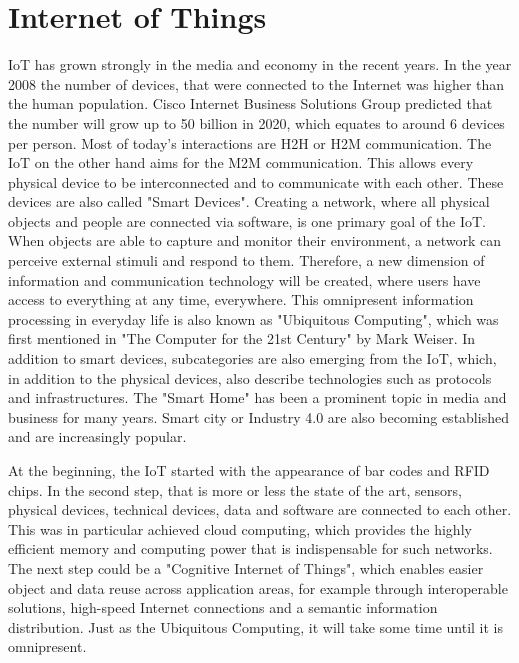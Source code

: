 \section{Internet of Things}
\ac{IoT} has grown strongly in the media and economy in the recent years.
In the year 2008 the number of devices, that were connected to the Internet was higher than the human population.\autocite[cf.][p. 3]{Eva:2011}
Cisco Internet Business Solutions Group predicted that the number will grow up to 50 billion in 2020, which equates to around 6 devices per person.\autocite[cf.][p. 4]{Eva:2011}
Most of today's interactions are \ac{H2H} or \ac{H2M} communication.
The \ac{IoT} on the other hand aims for the \ac{M2M} communication.
This allows every physical device to be interconnected and to communicate with each other.
These devices are also called "Smart Devices".
Creating a network, where all physical objects and people are connected via software, is one primary goal of the \ac{IoT}.\autocite[cf.][p.206]{Rui:2015}\autocite[cf.][p.2]{Kra:2013}
When objects are able to capture and monitor their environment, a network can perceive external stimuli and respond to them.\autocite[cf.][p. 40]{Itu11}
Therefore, a new dimension of information and communication technology will be created, where users have access to everything at any time, everywhere.
This omnipresent information processing in everyday life is also known as "Ubiquitous Computing", which was first mentioned in "The Computer for the 21st Century"\autocite{Wei:1991} by Mark Weiser.
In addition to smart devices, subcategories are also emerging from the \ac{IoT}, which, in addition to the physical devices, also describe technologies such as protocols and infrastructures.
The "Smart Home" has been a prominent topic in media and business for many years.
Smart city or Industry 4.0 are also becoming established and are increasingly popular.

At the beginning, the \ac{IoT} started with the appearance of bar codes and \ac{RFID} chips.\autocite[cf.][p. 13]{Kra:2013}
In the second step, that is more or less the state of the art, sensors, physical devices, technical devices, data and software are connected to each other.\autocite[cf.][p. 13]{Kra:2013}
This was in particular achieved cloud computing, which provides the highly efficient memory and computing power that is indispensable for such networks.\autocite[cf.][p. 206]{Rui:2015}
The next step could be a "Cognitive Internet of Things", which enables easier object and data reuse across application areas, for example through interoperable solutions, high-speed Internet connections and a semantic information distribution.\autocite[cf.][p. V]{Kra:2013}
Just as the Ubiquitous Computing, it will take some time until it is omnipresent.


